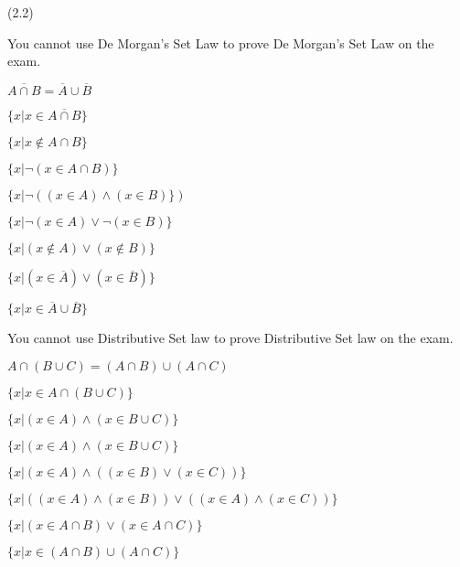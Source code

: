 \documentclass{exam}
\begin{document}
\begin{questions}
\newpage

 (2.2)
\begin{subparts}

\begin{center}

You cannot use De Morgan's Set Law to prove De Morgan's Set Law on the exam.

\( \overline{A \cap B} = \overline{A} \cup \overline{B} \)

\( \{ x | x \in \overline{A \cap B}  \} \)

\( \{ x | x \notin {A \cap B}  \} \)

\( \{ x | \neg (x \in {A \cap B})  \} \)

\( \{ x | \neg ( (x \in A) \land (x \in B)  \} ) \)

\( \{ x | \neg(x \in A) \lor \neg (x \in B) \} \)

\( \{ x | (x \notin A) \lor (x \notin B) \} \)

\( \{ x | (x \in \overline{A}) \lor (x \in \overline{B}) \} \)

\( \{ x | x \in \overline{A} \cup \overline{B} \} \)

\end{center}


\begin{center}

You cannot use Distributive Set law to prove Distributive Set law on the exam.

\( A \cap (B \cup C) = (A \cap B) \cup (A \cap C) \)

\( \{ x | x \in A \cap (B \cup C) \} \)

\( \{ x | (x \in A) \land (x \in B \cup C) \}\)

\( \{ x | (x \in A) \land (x \in B \cup C) \}\)

\( \{ x | (x \in A) \land ((x \in B) \lor (x \in C)) \}\)

\( \{ x | ((x \in A) \land (x \in B)) \lor ((x \in A) \land (x \in C)) \}\)

\( \{ x | (x \in A \cap B) \lor (x \in A \cap C) \}\)

\( \{ x | x \in (A \cap B) \cup (A \cap C) \}\)

\end{center}



\end{subparts}
\end{questions}
\end{document}
